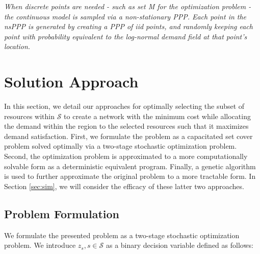 \documentclass[onecolumn,draftcls]{IEEEtran}
\begin{document}
\textit{When discrete points are needed - such as set M for the optimization problem - the continuous model is sampled via a non-stationary PPP.  Each point in the nsPPP is generated by creating a PPP of iid points, and randomly keeping each point with probability equivalent to the log-normal demand field at that point's location.}
\fi

\section{Solution Approach} \label{sec:approach}

In this section, we detail our approaches for optimally selecting the subset of resources within $\mathcal{S}$ to create a network with the minimum cost while allocating the demand within the region to the selected resources such that it maximizes demand satisfaction.  First, we formulate the problem as a capacitated set cover problem solved optimally via a two-stage stochastic optimization problem.  Second, the optimization problem is approximated to a more computationally solvable form as a deterministic equivalent program.  Finally, a genetic algorithm is used to further approximate the original problem to a more tractable form.  In Section \ref{sec:sim}, we will consider the efficacy of these latter two approaches.


\subsection{Problem Formulation} \label{subsec:stoch}


We formulate the presented problem as a two-stage stochastic optimization problem.  We introduce $z_s, s \in \mathcal{S}$ as a binary decision variable defined as follows:
\end{document}
